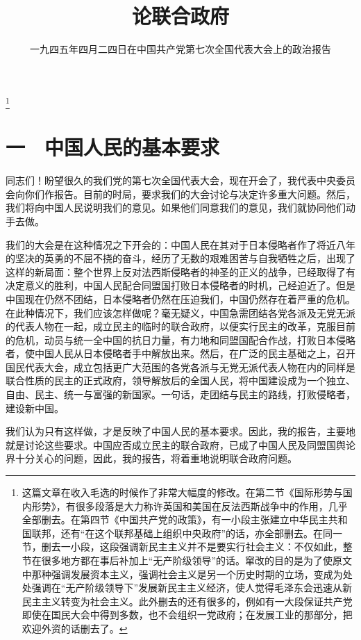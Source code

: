 
\title{论联合政府}
\date{一九四五年四月二四日在中国共产党第七次全国代表大会上的政治报告}
\thanks{这篇文章在收入毛选的时候作了非常大幅度的修改。在第二节《国际形势与国内形势》，有很多段落是大力称许英国和美国在反法西斯战争中的作用，几乎全部删去。在第四节《中国共产党的政策》，有一小段主张建立中华民主共和国联邦，还有“在这个联邦基础上组织中央政府”的话，亦全部删去。在同一节，删去一小段，这段强调新民主主义并不是要实行社会主义：不仅如此，整节在很多地方都在事后补加上“无产阶级领导”的话。窜改的目的是为了使原文中那种强调发展资本主义，强调社会主义是另一个历史时期的立场，变成为处处强调在“无产阶级领导下”发展新民主主义经济，使人觉得毛泽东会迅速从新民主主义转变为社会主义。此外删去的还有很多的，例如有一大段保证共产党即使在国民大会中得到多数，也不会组织一党政府；在发展工业的那部分，把欢迎外资的话删去了。}
\maketitle


\section{一　中国人民的基本要求}

同志们！盼望很久的我们党的第七次全国代表大会，现在开会了，我代表中央委员会向你们作报告。目前的时局，要求我们的大会讨论与决定许多重大问题。然后，我们将向中国人民说明我们的意见。如果他们同意我们的意见，我们就协同他们动手去做。

我们的大会是在这种情况之下开会的：中国人民在其对于日本侵略者作了将近八年的坚决的英勇的不屈不挠的奋斗，经历了无数的艰难困苦与自我牺牲之后，出现了这样的新局面：整个世界上反对法西斯侵略者的神圣的正义的战争，已经取得了有决定意义的胜利，中国人民配合同盟国打败日本侵略者的时机，己经迫近了。但是中国现在仍然不团结，日本侵略者仍然在压迫我们，中国仍然存在着严重的危机。在此种情况下，我们应该怎样做呢？毫无疑义，中国急需团结各党各派及无党无派的代表人物在一起，成立民主的临时的联合政府，以便实行民主的改革，克服目前的危机，动员与统一全中国的抗日力量，有力地和同盟国配合作战，打败日本侵略者，使中国人民从日本侵略者手中解放出来。然后，在广泛的民主基础之上，召开国民代表大会，成立包括更广大范围的各党各派与无党无派代表人物在内的同样是联合性质的民主的正式政府，领导解放后的全国人民，将中国建设成为一个独立、自由、民主、统一与富强的新国家。一句话，走团结与民主的路线，打败侵略者，建设新中国。

我们认为只有这样做，才是反映了中国人民的基本要求。因此，我的报告，主要地就是讨论这些要求。中国应否成立民主的联合政府，已成了中国人民及同盟国舆论界十分关心的问题，因此，我的报告，将着重地说明联合政府问题。

